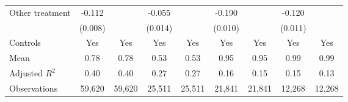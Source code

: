 {\begin{tabular}{l*{8}{c}}
Other treatment     &      -0.112\sym{***}&                     &      -0.055\sym{***}&                     &      -0.190\sym{***}&                     &      -0.120\sym{***}&                     \\
                    &     (0.008)         &                     &     (0.014)         &                     &     (0.010)         &                     &     (0.011)         &                     \\
Controls            &         Yes         &         Yes         &         Yes         &         Yes         &         Yes         &         Yes         &         Yes         &         Yes         \\
\hline
Mean                &        0.78         &        0.78         &        0.53         &        0.53         &        0.95         &        0.95         &        0.99         &        0.99         \\
Adjusted \(R^{2}\)  &        0.40         &        0.40         &        0.27         &        0.27         &        0.16         &        0.15         &        0.15         &        0.13         \\
Observations        &      59,620         &      59,620         &      25,511         &      25,511         &      21,841         &      21,841         &      12,268         &      12,268         \\
\hline\hline
\end{tabular}
}
